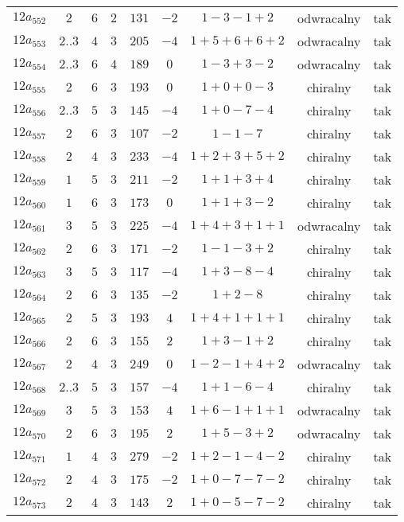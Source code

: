 \begin{longtable}{ccccccccc}
$12a_{552}$ & $2$ & $6$ & $2$ & $131$ & $-2$ & $1-3-1+2$ & odwracalny & tak \\
$12a_{553}$ & $2..3$ & $4$ & $3$ & $205$ & $-4$ & $1+5+6+6+2$ & odwracalny & tak \\
$12a_{554}$ & $2..3$ & $6$ & $4$ & $189$ & $0$ & $1-3+3-2$ & odwracalny & tak \\
$12a_{555}$ & $2$ & $6$ & $3$ & $193$ & $0$ & $1+0+0-3$ & chiralny & tak \\
$12a_{556}$ & $2..3$ & $5$ & $3$ & $145$ & $-4$ & $1+0-7-4$ & chiralny & tak \\
$12a_{557}$ & $2$ & $6$ & $3$ & $107$ & $-2$ & $1-1-7$ & chiralny & tak \\
$12a_{558}$ & $2$ & $4$ & $3$ & $233$ & $-4$ & $1+2+3+5+2$ & chiralny & tak \\
$12a_{559}$ & $1$ & $5$ & $3$ & $211$ & $-2$ & $1+1+3+4$ & chiralny & tak \\
$12a_{560}$ & $1$ & $6$ & $3$ & $173$ & $0$ & $1+1+3-2$ & chiralny & tak \\
$12a_{561}$ & $3$ & $5$ & $3$ & $225$ & $-4$ & $1+4+3+1+1$ & odwracalny & tak \\
$12a_{562}$ & $2$ & $6$ & $3$ & $171$ & $-2$ & $1-1-3+2$ & chiralny & tak \\
$12a_{563}$ & $3$ & $5$ & $3$ & $117$ & $-4$ & $1+3-8-4$ & chiralny & tak \\
$12a_{564}$ & $2$ & $6$ & $3$ & $135$ & $-2$ & $1+2-8$ & chiralny & tak \\
$12a_{565}$ & $2$ & $5$ & $3$ & $193$ & $4$ & $1+4+1+1+1$ & chiralny & tak \\
$12a_{566}$ & $2$ & $6$ & $3$ & $155$ & $2$ & $1+3-1+2$ & chiralny & tak \\
$12a_{567}$ & $2$ & $4$ & $3$ & $249$ & $0$ & $1-2-1+4+2$ & odwracalny & tak \\
$12a_{568}$ & $2..3$ & $5$ & $3$ & $157$ & $-4$ & $1+1-6-4$ & chiralny & tak \\
$12a_{569}$ & $3$ & $5$ & $3$ & $153$ & $4$ & $1+6-1+1+1$ & odwracalny & tak \\
$12a_{570}$ & $2$ & $6$ & $3$ & $195$ & $2$ & $1+5-3+2$ & odwracalny & tak \\
$12a_{571}$ & $1$ & $4$ & $3$ & $279$ & $-2$ & $1+2-1-4-2$ & chiralny & tak \\
$12a_{572}$ & $2$ & $4$ & $3$ & $175$ & $-2$ & $1+0-7-7-2$ & chiralny & tak \\
$12a_{573}$ & $2$ & $4$ & $3$ & $143$ & $2$ & $1+0-5-7-2$ & chiralny & tak \\

\end{longtable}
